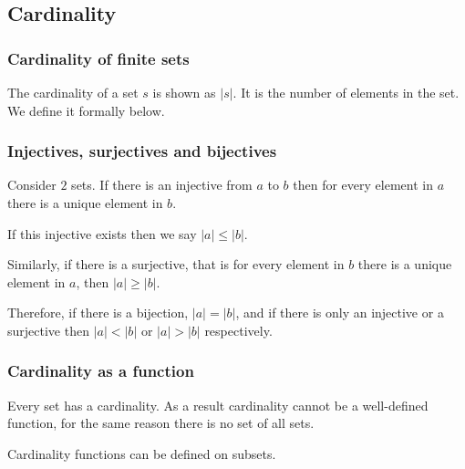 
\subsection{Cardinality}

\subsubsection{Cardinality of finite sets}

The cardinality of a set \(s\) is shown as \(|s|\). It is the number of elements in the set. We define it formally below.

\subsubsection{Injectives, surjectives and bijectives}

Consider \(2\) sets. If there is an injective from \(a\) to \(b\) then for every element in \(a\) there is a unique element in \(b\).

If this injective exists then we say \(|a|\le |b|\).

Similarly, if there is a surjective, that is for every element in \(b\) there is a unique element in \(a\), then \(|a|\ge |b|\).

Therefore, if there is a bijection, \(|a|=|b|\), and if there is only an injective or a surjective then \(|a|<|b|\) or \(|a|>|b|\) respectively.

\subsubsection{Cardinality as a function}

Every set has a cardinality. As a result cardinality cannot be a well-defined function, for the same reason there is no set of all sets.

Cardinality functions can be defined on subsets.

